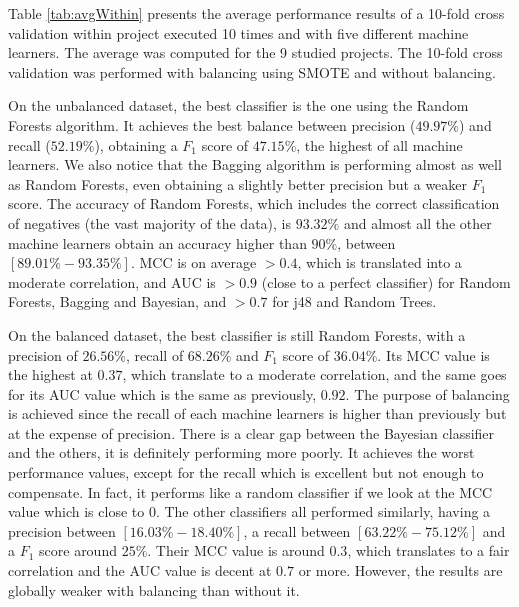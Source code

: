 Table \ref{tab:avgWithin} presents the average performance results of a 10-fold cross validation within project executed 10 times and with five different machine learners. The average was computed for the 9 studied projects. The 10-fold cross validation was performed with balancing using SMOTE and without balancing.

On the unbalanced dataset, the best classifier is the one using the Random Forests algorithm. It achieves the best balance between precision ($49.97\%$) and recall ($52.19\%$), obtaining a $F_{1}$ score of $47.15\%$, the highest of all machine learners. We also notice that the Bagging algorithm is performing almost as well as Random Forests, even obtaining a slightly better precision but a weaker $F_{1}$ score. The accuracy of Random Forests, which includes the correct classification of negatives (the vast majority of the data), is $93.32\%$ and almost all the other machine learners obtain an accuracy higher than $90\%$, between $[89.01\%-93.35\%]$. MCC is on average $>0.4$, which is translated into a moderate correlation, and AUC is $>0.9$ (close to a perfect classifier) for Random Forests, Bagging and Bayesian, and $>0.7$ for j48 and Random Trees.

On the balanced dataset, the best classifier is still Random Forests, with a precision of $26.56\%$, recall of $68.26\%$ and $F_{1}$ score of $36.04\%$. Its MCC value is the highest at $0.37$, which translate to a moderate correlation, and the same goes for its AUC value which is the same as previously, $0.92$. The purpose of balancing is achieved since the recall of each machine learners is higher than previously but at the expense of precision. There is a clear gap between the Bayesian classifier and the others, it is definitely performing more poorly. It achieves the worst performance values, except for the recall which is excellent but not enough to compensate. In fact, it performs like a random classifier if we look at the MCC value which is close to $0$. The other classifiers all performed similarly, having a precision between $[16.03\%-18.40\%]$, a recall between $[63.22\%-75.12\%]$ and a $F_{1}$ score around $25\%$. Their MCC value is around $0.3$, which translates to a fair correlation and the AUC value is decent at $0.7$ or more. However, the results are globally weaker with balancing than without it.

